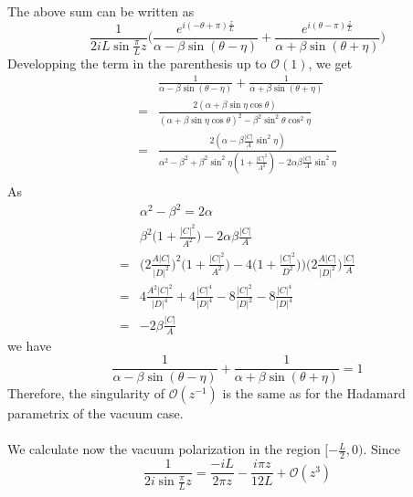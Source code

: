 The above sum can be written as
\begin{equation}
\frac{1}{2i L\sin\frac{\pi}{L}z} \bigg( \frac{e^{i(-\theta + \pi)\frac{z}{L}}}{\alpha - \beta \sin (\theta - \eta)}
+ \frac{e^{i(\theta - \pi) \frac{z}{L}}}{\alpha + \beta \sin (\theta + \eta)}
\bigg)
\end{equation}
Developping the term in the parenthesis up to $\mathcal{O}(1)$, we get
\begin{equation}
\begin{split}
& \frac{1}{\alpha - \beta \sin (\theta - \eta)}
   + \frac{1}{\alpha + \beta \sin (\theta + \eta)} \\
= & \frac{2(\alpha + \beta \sin \eta \cos \theta)}{(\alpha + \beta \sin \eta \cos \theta)^2 - \beta^2 \sin^2 \theta \cos^2 \eta} \\
= & \frac{2(\alpha - \beta \frac{|C|}{A} \sin^2 \eta)}{\alpha^2 - \beta^2 + \beta^2 \sin^2 \eta (1 + \frac{|C|^2}{A^2}) - 2 \alpha \beta \frac{|C|}{A} \sin^2 \eta} \\
\end{split}
\end{equation}
As
\begin{equation*}
\begin{split}
& \alpha^2 - \beta ^ 2 = 2 \alpha \\
&  \beta^2 \big(1 + \frac{|C|^2}{A^2} \big) - 2 \alpha \beta \frac{|C|}{A} \\
= & \big(2\frac{A |C|}{|D|^2} \big)^2 \big( 1+ \frac{|C|^2}{A^2} \big) - 4\big( 1+ \frac{|C|^2}{D^2}))\big(2\frac{A |C|}{|D|^2} \big) \frac{|C|}{A}  \\
= & 4 \frac{A^2 |C|^2}{|D|^4} + 4\frac{|C|^4}{|D|^4} - 8\frac{|C|^2}{|D|^2} - 8\frac{|C|^4}{|D|^4} \\
= & -2 \beta \frac{|C|}{A}
\end{split}
\end{equation*}
we have
\begin{equation}\label{nef-lourdeur}
\frac{1}{\alpha - \beta \sin (\theta - \eta)}
   + \frac{1}{\alpha + \beta \sin (\theta + \eta)} 
= 1
\end{equation}
Therefore, the singularity of $\mathcal{O}(z^{-1})$ is the same as for the Hadamard parametrix of the vacuum case.\\\\
We calculate now the vacuum polarization in the region $[-\frac{L}{2}, 0)$. Since
\begin{equation*}
\frac{1}{2i \sin \frac{\pi}{L}z } = \frac{-iL}{2 \pi z} - \frac{i \pi z}{12L} + \mathcal{O}(z^3) 
\end{equation*}
